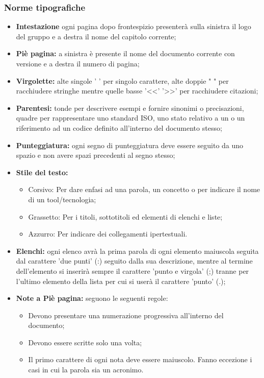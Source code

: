 \documentclass[NormeDiProgetto.tex]{subfiles}
\begin{document}
	\subsubsection{Norme tipografiche}
		\begin{itemize}
			\item \textbf{Intestazione} ogni pagina dopo frontespizio presenterà sulla sinistra il logo del gruppo e a destra il nome del capitolo corrente;
			
			\item \textbf{Piè pagina:} a sinistra è presente il nome del documento corrente con versione e a destra il numero di pagina; 
			
			\item \textbf{Virgolette:} alte singole ' ' per singolo carattere, alte doppie " " per racchiudere stringhe mentre quelle basse '\textless \textless ' '\textgreater \textgreater ' per racchiudere citazioni;
			 
			\item \textbf{Parentesi:} tonde per descrivere esempi e fornire sinonimi o precisazioni, quadre per rappresentare uno standard ISO, uno stato relativo a un  o un riferimento ad un codice definito all'interno del documento stesso;
			
			\item \textbf{Punteggiatura:} ogni segno di punteggiatura deve essere seguito da uno spazio e non avere spazi precedenti al segno stesso;

			\item \textbf{Stile del testo:} 
			\begin{itemize}
				\item Corsivo: Per dare enfasi ad una parola, un concetto o per indicare il nome di un tool/tecnologia;
				\item Grassetto: Per i titoli, sottotitoli ed elementi di elenchi e liste;
				\item Azzurro: Per indicare dei collegamenti ipertestuali.
			\end{itemize}
		
			\item \textbf{Elenchi:} ogni elenco avrà la prima parola di ogni elemento maiuscola seguita dal carattere 'due punti' (:) seguito dalla sua descrizione, mentre al termine dell'elemento si inserirà sempre il carattere 'punto e virgola' (;) tranne per l'ultimo elemento della lista per cui si userà il carattere 'punto' (.);
			 
			\item \textbf{Note a Piè pagina:} seguono le seguenti regole: 
			\begin{itemize}
				\item Devono presentare una numerazione progressiva all'interno del documento;
				\item Devono essere scritte solo una volta;
				\item Il primo carattere di ogni nota deve essere maiuscolo. Fanno eccezione i casi in cui la parola sia un acronimo.
			\end{itemize}
			 

\end{itemize}
\end{document}
